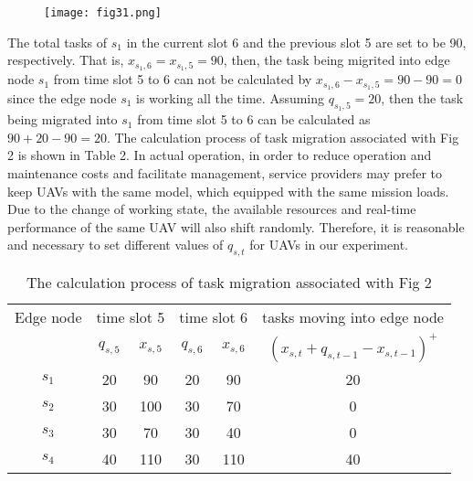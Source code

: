 \documentclass[journal,article,submit,pdftex,moreauthors]{Definitions/mdpi}
\begin{document}
\begin{figure}[H]
\centering
\texttt{[image: fig31.png]} 

 \centering
\fontsize{6.5}{8}
\end{figure}
The total tasks of $s_1$ in the current slot 6 and the previous slot 5 are set to be 90, respectively. That is,  $x_{s_1,6}=x_{s_1,5}=90$, then, the task being migrited into edge node $s_1$  from time slot 5 to 6 can not be calculated by $x_{s_1,6}-x_{s_1,5}=90-90=0$ since the edge node $s_1$ is working all the time. Assuming $q_{s_1,5}=20$, then the task being migrated into $s_1$  from time slot 5 to 6 can be calculated as $90+20-90=20$. The calculation process of task migration  associated with Fig 2 is shown in Table 2. In actual operation, in order to reduce operation and maintenance costs and facilitate management, service providers may prefer to keep UAVs with the same model, which equipped with the same mission loads. Due to the change of working state, the available resources and real-time performance of the same UAV will also shift randomly. Therefore, it is reasonable and necessary to set different values of $q_{s,t}$ for UAVs in our experiment.

\begin{table}[h] %
 \footnotesize
\caption{The calculation process of task migration  associated with Fig 2} %
\begin{tabular}{c |c| c| c| c| c} %
\hline
Edge node  & \multicolumn{2}{|c|}{time slot 5} & \multicolumn{2}{|c|}{time slot 6} &  tasks moving into edge node\\  \cline{2-6} %
& $q_{s,5}$ & $x_{s,5}$  & $q_{s,6} $ & $x_{s,6}$ &  $(x_{s,t}+q_{s,t-1}-x_{s,t-1})^{+}$\\ \cline{2-6}
\hline %
$s_1$ & 20 & 90 & 20 & 90 & 20 \\
$s_2$ & 30 & 100 & 30  & 70 & 0 \\
$s_3$ & 30 & 70 & 30 & 40 & 0 \\
$s_4$ & 40 & 110 & 30 & 110 & 40\\
\hline
\end{tabular}
\end{table}
\end{document}
